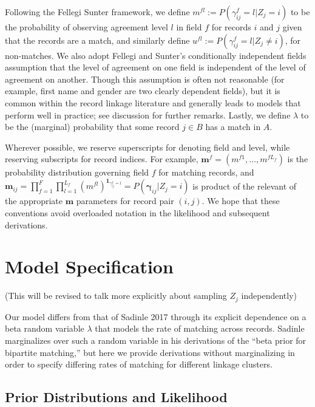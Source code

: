 \documentclass[
  12pt,
]{article}
\begin{document}
Following the Fellegi Sunter framework, we define
\(m^{fl}:= P(\gamma_{ij}^f = l |Z_j = i)\) to be the probability of
observing agreement level \(l\) in field \(f\) for records \(i\) and
\(j\) given that the records are a match, and similarly define
\(u^{fl}:= P(\gamma_{ij}^f = l |Z_j \neq i)\), for non-matches. We also
adopt Fellegi and Sunter's conditionally independent fields assumption
that the level of agreement on one field is independent of the level of
agreement on another. Though this assumption is often not reasonable
(for example, first name and gender are two clearly dependent fields),
but it is common within the record linkage literature and generally
leads to models that perform well in practice; see discussion for
further remarks. Lastly, we define \(\lambda\) to be the (marginal)
probability that some record \(j \in B\) has a match in \(A\).

Wherever possible, we reserve superscripts for denoting field and level,
while reserving subscripts for record indices. For example,
\(\mathbf{m}^f = (m^{f1}, \ldots, m^{fL_f})\) is the probability
distribution governing field \(f\) for matching records, and
\(\mathbf{m}_{ij}= \prod_{f=1}^{F}\prod_{l=1}^{L_f} \left(m^{fl}\right)^{\mathbf{1}_{\gamma_{ij}^f = l}} = P(\boldsymbol{\gamma}_{ij}|Z_j = i)\)
is product of the relevant of the appropriate \(\mathbf{m}\) parameters
for record pair \((i,j)\). We hope that these conventions avoid
overloaded notation in the likelihood and subsequent derivations.

\hypertarget{model-specification}{%
\section{Model Specification}\label{model-specification}}

(This will be revised to talk more explicitly about sampling \(Z_j\)
independently)

Our model differs from that of Sadinle 2017 through its explicit
dependence on a beta random variable \(\lambda\) that models the rate of
matching across records. Sadinle marginalizes over such a random
variable in his derivations of the ``beta prior for bipartite
matching,'' but here we provide derivations without marginalizing in
order to specify differing rates of matching for different linkage
clusters.

\hypertarget{prior-distributions-and-likelihood}{%
\subsection{Prior Distributions and
Likelihood}\label{prior-distributions-and-likelihood}}
\end{document}
